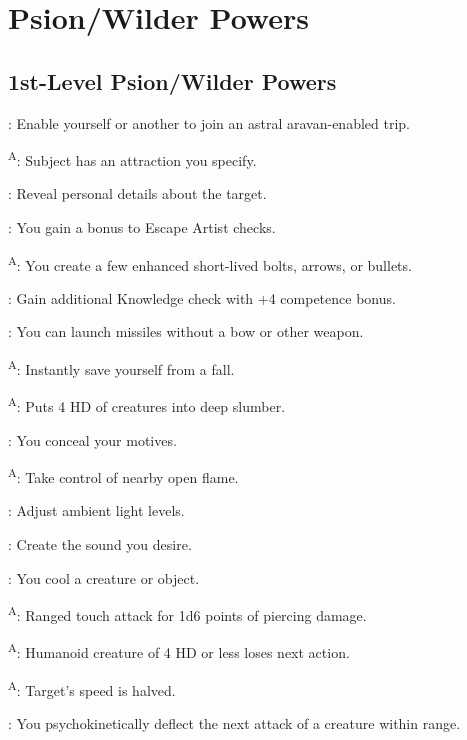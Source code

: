 \section{Psion/Wilder Powers}




\subsection{1st-Level Psion/Wilder Powers}

: Enable yourself or another to join an astral  aravan-enabled trip.

\textsuperscript{A}: Subject has an attraction you specify.

: Reveal personal details about the target.

: You gain a bonus to Escape Artist checks.

\textsuperscript{A}: You create a few enhanced short-lived bolts, arrows, or bullets.

: Gain additional Knowledge check with +4 competence bonus.

: You can launch missiles without a bow or other weapon.

\textsuperscript{A}: Instantly save yourself from a fall.

\textsuperscript{A}: Puts 4 HD of creatures into deep slumber.

: You conceal your motives.

\textsuperscript{A}: Take control of nearby open flame.

: Adjust ambient light levels.

: Create the sound you desire.

: You cool a creature or object.

\textsuperscript{A}: Ranged touch attack for 1d6 points of piercing damage.

\textsuperscript{A}: Humanoid creature of 4 HD or less loses next action.

\textsuperscript{A}: Target's speed is halved.

: You psychokinetically deflect the next attack of a creature within range.

